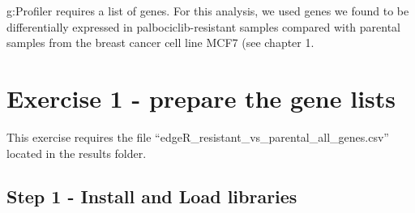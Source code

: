 \documentclass[
]{book}
\begin{document}
g:Profiler requires a list of genes. For this analysis, we used genes we found to be differentially expressed in palbociclib-resistant samples compared with parental samples from the breast cancer cell line MCF7 (see chapter 1.

\section{Exercise 1 - prepare the gene lists}\label{exercise-1-defined}

This exercise requires the file ``edgeR\_resistant\_vs\_parental\_all\_genes.csv'' located in the results folder.

\subsection{Step 1 - Install and Load libraries}\label{step-1---install-and-load-libraries}
\end{document}
